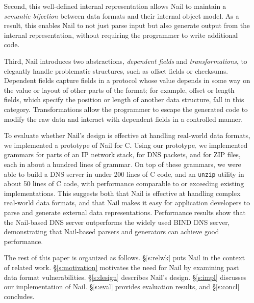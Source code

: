 Second, this well-defined internal representation allows Nail to
maintain a {\em semantic bijection} between data formats and their
internal object model.  As a result, this enables Nail to not just
parse input but also generate output from the internal representation,
without requiring the programmer to write additional code.




Third, Nail introduces two abstractions, \emph{dependent fields} and
\emph{transformations}, to elegantly handle problematic structures,
such as offset fields or checksums.  Dependent fields capture fields
in a protocol whose value depends in some way on the value or layout
of other parts of the format; for example, offset or length fields,
which specify the position or length of another data structure, fall
in this category.  Transformations allow the programmer to escape the
generated code to modify the raw data and interact with dependent fields
in a controlled manner.

To evaluate whether Nail's design is effective at handling real-world data
formats, we implemented a prototype of Nail for C\@. Using our prototype, we
implemented grammars for parts of an IP network stack, for DNS packets,
and for ZIP files, each in about a hundred lines of grammar. On top of these
grammars, we were able to build a DNS server in under 200 lines of C code, and
an {\tt unzip} utility in about 50 lines of C code, with performance comparable
to or exceeding existing implementations. This suggests both that Nail is
effective at handling complex real-world data formats, and that Nail makes it
easy for application developers to parse and generate external data
representations. Performance results show that the Nail-based DNS server
outperforms the widely used BIND DNS server, demonstrating that Nail-based
parsers and generators can achieve good performance.

The rest of this paper is organized as follows.  \S\ref{s:relwk}
puts Nail in the context of related work.
\S\ref{s:motivation} motivates the need for Nail by examining
past data format vulnerabilities.
\S\ref{s:design} describes
Nail's design.  \S\ref{s:impl} discusses our implementation
of Nail.  \S\ref{s:eval} provides evaluation results, and
\S\ref{s:concl} concludes.

